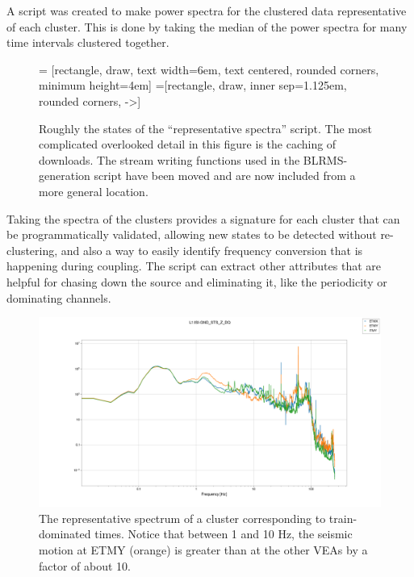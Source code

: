 \documentclass[colorlinks=true,pdfstartview=FitV,linkcolor=blue,
            citecolor=red,urlcolor=magenta]{ligodoc}
\begin{document}
A script was created to make power spectra for the clustered data representative of each cluster.
This is done by taking the median of the power spectra for many time intervals clustered together.
\begin{figure}[h]
   = [rectangle, draw, text width=6em, text centered, rounded corners, minimum height=4em]
   =[rectangle, draw, inner sep=1.125em, rounded corners, ->]
  \caption{Roughly the states of the ``representative spectra'' script. The most complicated overlooked detail in this figure is the caching of downloads. The stream writing functions used in the BLRMS-generation script have been moved and are now included from a more general location.}
\end{figure}

Taking the spectra of the clusters provides a signature for each cluster that can be programmatically validated, allowing new states to be detected without re-clustering, and also a way to easily identify frequency conversion that is happening during coupling.
The script can extract other attributes that are helpful for chasing down the source and eliminating it, like the periodicity or dominating channels.
\begin{figure}
  \includegraphics[width=\textwidth]{assets/report2/0-L1:ISI-GND_STS_Z_DQ.png}
  \caption{The representative spectrum of a cluster corresponding to train-dominated times. Notice that between 1 and 10 Hz, the seismic motion at ETMY (orange) is greater than at the other VEAs by a factor of about 10.}
\end{figure}
\end{document}
